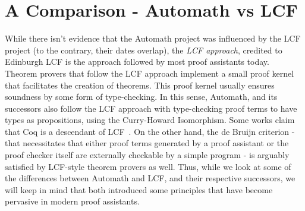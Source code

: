 \documentclass{article}
\begin{document}
\section{A Comparison - Automath vs LCF}
  	While there isn't evidence that the 
  	Automath project was influenced by 
  	the LCF project (to the contrary, 
  	their dates overlap), the 
  	\textit{LCF approach}, credited 
  	to Edinburgh LCF is the approach
  	followed by most proof assistants 
  	today. Theorem provers that follow 
  	the LCF approach implement a small 
  	proof kernel that facilitates 
  	the creation of theorems. This 
  	proof kernel usually ensures 
  	soundness by some form of 
  	type-checking. In this sense, 
  	Automath, and its successors also 
  	follow the LCF approach with 
  	type-checking proof terms to have 
  	types as propositions, using the 
  	Curry-Howard Isomorphism. Some works 
  	claim that Coq is a descendant of 
  	LCF~\cite
  	{DBLP:journals/corr/abs-1907-02836}. 
  	On the other hand, the de Bruijn 
  	criterion - that necessitates 
  	that either proof terms generated 
  	by a proof assistant or the proof 
  	checker itself are externally 
  	checkable by a simple program - 
  	is arguably satisfied by LCF-style
  	theorem provers as well. Thus, 
  	while we look at some of the 
  	differences between Automath and 
  	LCF, and their respective successors, 
  	we will keep in mind that both 
  	introduced some principles that 
  	have become pervasive in modern 
  	proof assistants.
  	
\end{document}

